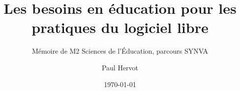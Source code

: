 \titlehead{}
\title{Les besoins en éducation pour les pratiques du logiciel libre}
\subtitle{Mémoire de M2 Sciences de l'Éducation, parcours SYNVA}
\author[PH]{Paul Hervot}
\date{\today}
\publishers{Université de Strasbourg} %

\frontmatter



\mainmatter
{}

\setchapterpreamble[u]{\margintoc}



\setchapterpreamble[u]{\margintoc}


\setchapterpreamble[u]{\margintoc}



\setchapterpreamble[u]{\margintoc}



\setchapterpreamble[u]{\margintoc}

\setchapterpreamble[u]{\margintoc}



\setchapterpreamble[u]{\margintoc}


\appendix




\backmatter



